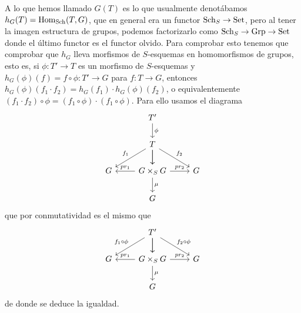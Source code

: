 \documentclass[GA.tex]{subfiles}
\begin{document}
A lo que hemos llamado $G(T)$ es lo que usualmente denotábamos $h_G(T)=\operatorname{Hom}_{\operatorname{Sch}}(T,G)$, que en general era un functor $\operatorname{Sch}_S\to\operatorname{Set}$, pero al tener la imagen estructura de grupos, podemos factorizarlo como $\operatorname{Sch}_S\to\operatorname{Grp}\to\operatorname{Set}$ donde el último functor es el functor olvido. Para comprobar esto tenemos que comprobar que $h_G$ lleva morfismos de $S$-esquemas en homomorfismos de grupos, esto es, si $\phi:T'\to T$ es un morfismo de $S$-esquemas y $h_G(\phi)(f)=f\circ\phi:T'\to G$ para $f:T\to G$, entonces $h_G(\phi)(f_1\cdot f_2)=h_G(f_1)\cdot h_G(\phi)(f_2)$, o equivalentemente $(f_1\cdot f_2)\circ\phi=(f_1\circ\phi)\cdot (f_1\circ\phi)$.  Para ello usamos el diagrama 
\[
\begin{tikzcd}
 & T' \arrow[d, "\phi"] &  \\
 & T \arrow[rd, "f_2"] \arrow[d] \arrow[ld, "f_1"'] \arrow[d] &  \\
G & G\times_S G \arrow[l, "pr_1"'] \arrow[r, "pr_2"] \arrow[d, "\mu"] & G \\
 & G & 
\end{tikzcd}
\]
que por conmutatividad es el mismo que
\[
\begin{tikzcd}
 & T' \arrow[rd, "f_2\circ\phi"] \arrow[d] \arrow[ld, "f_1\circ\phi"'] \arrow[d] &  \\
G & G\times_S G \arrow[l, "pr_1"'] \arrow[r, "pr_2"] \arrow[d, "\mu"] & G \\
 & G & 
\end{tikzcd}
\]
de donde se deduce la igualdad.
\end{document}
